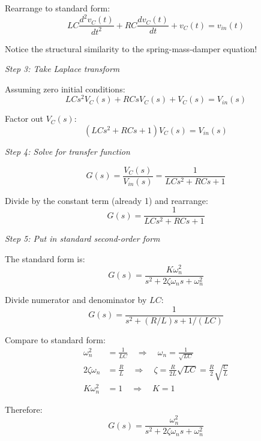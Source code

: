 \begin{example}
Rearrange to standard form:
\begin{equation}
LC \frac{d^2v_C(t)}{dt^2} + RC \frac{dv_C(t)}{dt} + v_C(t) = v_{in}(t)
\label{eq:rlc_diffeq}
\end{equation}

Notice the structural similarity to the spring-mass-damper equation!

\textit{Step 3: Take Laplace transform}

Assuming zero initial conditions:
\begin{equation}
LC s^2 V_C(s) + RC s V_C(s) + V_C(s) = V_{in}(s)
\end{equation}

Factor out $V_C(s)$:
\begin{equation}
(LC s^2 + RC s + 1) V_C(s) = V_{in}(s)
\end{equation}

\textit{Step 4: Solve for transfer function}

\begin{equation}
G(s) = \frac{V_C(s)}{V_{in}(s)} = \frac{1}{LC s^2 + RC s + 1}
\end{equation}

Divide by the constant term (already 1) and rearrange:
\begin{equation}
G(s) = \frac{1}{LCs^2 + RCs + 1}
\end{equation}

\textit{Step 5: Put in standard second-order form}

The standard form is:
\begin{equation}
G(s) = \frac{K\omega_n^2}{s^2 + 2\zeta\omega_n s + \omega_n^2}
\end{equation}

Divide numerator and denominator by $LC$:
\begin{equation}
G(s) = \frac{1}{s^2 + (R/L)s + 1/(LC)}
\end{equation}

Compare to standard form:
\begin{align}
\omega_n^2 &= \frac{1}{LC} \quad \Rightarrow \quad \omega_n = \frac{1}{\sqrt{LC}} \\
2\zeta\omega_n &= \frac{R}{L} \quad \Rightarrow \quad \zeta = \frac{R}{2L}\sqrt{LC} = \frac{R}{2}\sqrt{\frac{C}{L}} \\
K\omega_n^2 &= 1 \quad \Rightarrow \quad K = 1
\end{align}

Therefore:
\begin{equation}
\boxed{G(s) = \frac{\omega_n^2}{s^2 + 2\zeta\omega_n s + \omega_n^2}}
\end{equation}


\end{example}
